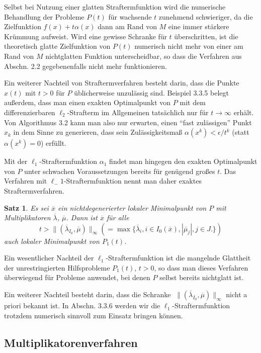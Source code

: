 \documentclass[11pt]{scrreprt}
\newcounter{thm}
\theoremstyle{thmstyle}
\numberwithin{thm}{section}
\newtheorem{satz}[thm]{Satz}
\begin{document}
Selbst bei Nutzung einer glatten Straftermfunktion wird die numerische Behandlung der Probleme $P(t)$ für wachsende $t$ zunehmend schwieriger, da die Zielfunktion $f (x) + t \alpha(x)$ dann am Rand von $M$ eine immer stärkere Krümmung aufweist. Wird eine gewisse Schranke für $t$ überschritten, ist die theoretisch glatte Zielfunktion von $P(t)$ numerisch nicht mehr von einer am Rand von $M$ nichtglatten Funktion unterscheidbar, so dass die Verfahren aus Abschn. 2.2 gegebenenfalls nicht mehr funktionieren.

Ein weiterer Nachteil von Straftermverfahren besteht darin, dass die Punkte $x(t)$ mit $t > 0$ für $P$ üblicherweise unzulässig sind. Beispiel 3.3.5 belegt außerdem, dass man einen exakten Optimalpunkt von $P$ mit dem differenzierbaren $\ell_2$-Strafterm im Allgemeinen tatsächlich nur für $t \rightarrow \infty$ erhält. Von Algorithmus 3.2 kann man also nur erwarten, einen \enquote{fast zulässigen} Punkt $x_k$ in dem Sinne zu generieren, dass sein Zulässigkeitsmaß $\alpha(x^k) < \epsilon/t^k$ (statt $\alpha(x^k) = 0$) erfüllt. ~\bigskip

Mit der $\ell_1$-Straftermfunktion $\alpha_1$ findet man hingegen den exakten Optimalpunkt von $P$ unter schwachen Voraussetzungen bereits für genügend großes $t$. Das Verfahren mit $\ell_-1$-Straftermfunktion nennt man daher exaktes Straftermverfahren.

\setcounter{thm}{7}

\begin{satz}
	Es sei $\overline{x}$ ein nichtdegenerierter lokaler Minimalpunkt von $P$ mit Multiplikatoren $\overline{\lambda}$, $\overline{\mu}$. Dann ist $\overline{x}$ für alle 
	$$ t > \| (\overline{\lambda}_{I_0}, \overline{\mu})\|_\infty (= \max \{ \overline{\lambda}_i, i \in I_0(\overline{x}), |\overline{\mu}_j|, j \in J. \}) $$
	auch lokaler Minimalpunkt von $P_1(t)$.
\end{satz}

Ein wesentlicher Nachteil der $\ell_1$-Straftermfunktion ist die mangelnde Glattheit der unrestringierten Hilfsprobleme $P_1(t)$, $t > 0$, so dass man dieses Verfahren überwiegend für Probleme anwendet, bei denen $P$ selbst bereits nichtglatt ist.

Ein weiterer Nachteil besteht darin, dass die Schranke $\|(\overline{\lambda}_{I_0}, \overline{\mu})\|_\infty$ nicht a priori bekannt ist. In Abschn. 3.3.6 werden wir die $\ell_1$-Straftermfunktion trotzdem numerisch sinnvoll zum Einsatz bringen können.

\subsection*{Multiplikatorenverfahren}
\end{document}
